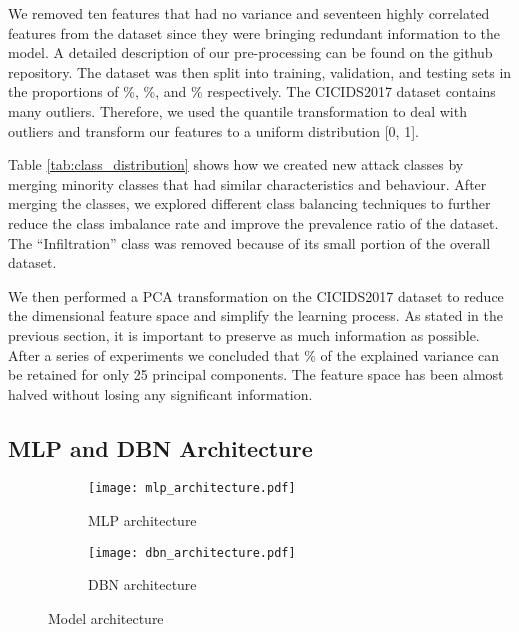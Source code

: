 \documentclass[runningheads]{llncs}
\begin{document}
We removed ten features that had no variance and seventeen highly correlated features from the dataset since they were bringing redundant information to the model. A detailed description of our pre-processing can be found on the github repository\footnotemark[\value{footnote}]. The dataset was then split into training, validation, and testing sets in the proportions of \%, \%, and \% respectively. The CICIDS2017 dataset contains many outliers. Therefore, we used the quantile transformation to deal with outliers and transform our features to a uniform distribution [0, 1].

Table \ref{tab:class_distribution} shows how we created new attack classes by merging minority classes that had similar characteristics and behaviour. After merging the classes, we explored different class balancing techniques to further reduce the class imbalance rate and improve the prevalence ratio of the dataset. The ``Infiltration'' class was removed because of its small portion of the overall dataset.

We then performed a \ac{PCA} transformation on the CICIDS2017 dataset to reduce the dimensional feature space and simplify the learning process. As stated in the previous section, it is important to preserve as much information as possible. After a series of experiments we concluded that \% of the explained variance can be retained for only 25 principal components. The feature space has been almost halved without losing any significant information.

\subsection{\ac{MLP} and \ac{DBN} Architecture}
\label{subsec:model architecture}

\begin{figure}[t]
    \centering
    \begin{subfigure}[b]{0.4\textwidth}
        \centering
        \texttt{[image: mlp\_architecture.pdf]}
        \caption{MLP architecture}
        \label{fig:mlp_architecture}
    \end{subfigure}
    \hfill
    \begin{subfigure}[b]{0.4\textwidth}
        \centering
        \texttt{[image: dbn\_architecture.pdf]}
        \caption{DBN architecture}
        \label{fig:dbn_architecture}
    \end{subfigure}
    \caption{Model architecture}
    \label{fig:model_architecture}
\end{figure}
\end{document}
